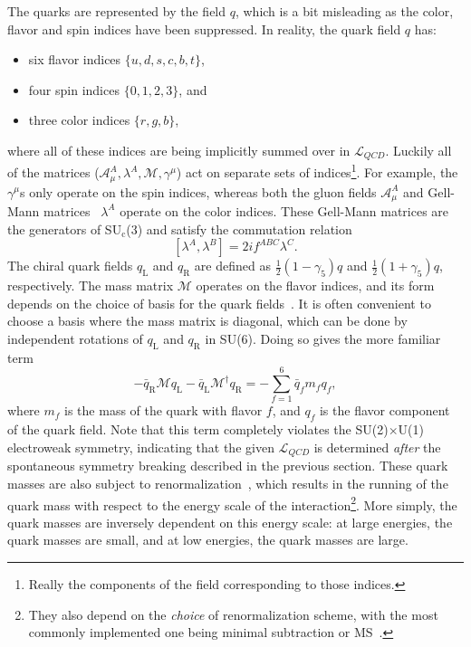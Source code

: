 The quarks are represented by the field $q$, which is a bit misleading as the color, flavor and spin indices have been suppressed. In reality, the quark field $q$ has:
%
\begin{itemize}
    \item six flavor indices $\{u, d, s, c, b, t\}$,
    \item four spin indices $\{0, 1, 2, 3\}$, and
    \item three color indices $\{r, g, b\}$,
\end{itemize}
%
where all of these indices are being implicitly summed over in $\mathcal{L}_{QCD}$. Luckily all of the matrices ($\mathcal{A}_\mu^A, \lambda^A, \mathcal{M}, \gamma^\mu$) act on separate sets of indices\footnote{Really the components of the field corresponding to those indices.}. For example, the $\gamma^\mu$s only operate on the spin indices, whereas both the gluon fields $\mathcal{A}_\mu^A$ and Gell-Mann matrices~\cite{GellMannEightfold} $\lambda^A$ operate on the color indices. These Gell-Mann matrices are the generators of SU$_\text{c}$(3) and satisfy the commutation relation
%
\begin{equation}
    \label{eq:gell_mann_commutation}
    [\lambda^A, \lambda^B] = 2if^{ABC}\lambda^C.
\end{equation}
%
The chiral quark fields $q_\text{L}$ and $q_\text{R}$ are defined as $\frac{1}{2}(1 - \gamma_5)q$ and $\frac{1}{2}(1 + \gamma_5)q$, respectively. The mass matrix $\mathcal{M}$ operates on the flavor indices, and its form depends on the choice of basis for the quark fields~\cite{QCDHistory}. It is often convenient to choose a basis where the mass matrix is diagonal, which can be done by independent rotations of $q_\text{L}$ and $q_\text{R}$ in SU(6). Doing so gives the more familiar term
%
\begin{equation}
    -\bar{q}_{\mathrm{R}} \mathcal{M} q_{\mathrm{L}}-\bar{q}_{\mathrm{L}} \mathcal{M}^{\dagger} q_{\mathrm{R}} = -\sum_{f = 1}^{6}\bar{q}_f m_f q_f,
    \label{eq:mass_matrix}
\end{equation}
where $m_f$ is the mass of the quark with flavor $f$, and $q_f$ is the flavor component of the quark field. Note that this term completely violates the SU(2)$\times$U(1) electroweak symmetry, indicating that the given $\mathcal{L}_{QCD}$ is determined \textit{after} the spontaneous symmetry breaking described in the previous section. These quark masses are also subject to renormalization~\cite{MassRenorm}, which results in the running of the quark mass with respect to the energy scale of the interaction\footnote{They also depend on the \textit{choice} of renormalization scheme, with the most commonly implemented one being minimal subtraction or MS~\cite{MSScheme}.}. More simply, the quark masses are inversely dependent on this energy scale: at large energies, the quark masses are small, and at low energies, the quark masses are large. 


